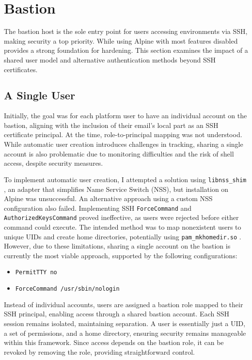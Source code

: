 \section{Bastion}
The bastion host is the sole entry point for users accessing environments via SSH, making security a top priority. While using Alpine with most features disabled provides a strong foundation for hardening. This section examines the impact of a shared user model and alternative authentication methods beyond SSH certificates.

\subsection{A Single User}
Initially, the goal was for each platform user to have an individual account on the bastion, aligning with the inclusion of their email's local part as an SSH certificate principal. At the time, role-to-principal mapping was not understood. While automatic user creation introduces challenges in tracking, sharing a single account is also problematic due to monitoring difficulties and the risk of shell access, despite security measures.

To implement automatic user creation, I attempted a solution using \texttt{libnss\_shim} \parencite{libnss_shim}, an adapter that simplifies Name Service Switch (NSS), but installation on Alpine was unsuccessful. An alternative approach using a custom NSS configuration also failed. Implementing SSH \texttt{ForceCommand} and \texttt{AuthorizedKeysCommand} proved ineffective, as users were rejected before either command could execute. The intended method was to map nonexistent users to unique UIDs and create home directories, potentially using \texttt{pam\_mkhomedir.so} \parencite{pam_mkhomedir}. However, due to these limitations, sharing a single account on the bastion is currently the most viable approach, supported by the following configurations: 

\begin{itemize}
    \item \texttt{PermitTTY no}
    \item \texttt{ForceCommand /usr/sbin/nologin}
\end{itemize}

Instead of individual accounts, users are assigned a bastion role mapped to their SSH principal, enabling access through a shared bastion account. Each SSH session remains isolated, maintaining separation. A user is essentially just a UID, a set of permissions, and a home directory, ensuring security remains manageable within this framework. Since access depends on the bastion role, it can be revoked by removing the role, providing straightforward control.

